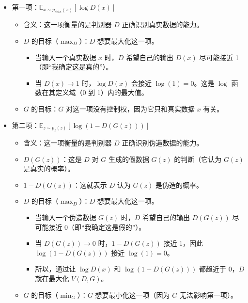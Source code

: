 \begin{itemize}
\tightlist
\item
  第一项：\(\mathbb{E}_{x\sim p_{data}(x)}[\log D(x)]\)

  \begin{itemize}
  \tightlist
  \item
    含义：这一项衡量的是判别器 \(D\) 正确识别真实数据的能力。
  \item
    \(D\) 的目标（\(\max_D\)）：\(D\) 想要最大化这一项。

    \begin{itemize}
    \tightlist
    \item
      当输入一个真实数据 \(x\) 时，\(D\) 希望自己的输出 \(D(x)\) 尽可能接近 1（即``我确定这是真的''）。
    \item
      当 \(D(x)\to 1\) 时，\(\log D(x)\) 会接近 \(\log(1)=0\)。这是 \(\log\) 函数在其定义域（0 到 1）内的最大值。
    \end{itemize}
  \item
    \(G\) 的目标：\(G\) 对这一项没有控制权，因为它只和真实数据 \(x\) 有关。
  \end{itemize}
\item
  第二项：\(\mathbb{E}_{z\sim p_z(z)}[\log(1-D(G(z)))]\)

  \begin{itemize}
  \tightlist
  \item
    含义：这一项衡量的是判别器 \(D\) 正确识别伪造数据的能力。
  \item
    \(D(G(z))\)：这是 \(D\) 对 \(G\) 生成的假数据 \(G(z)\) 的判断（它认为 \(G(z)\) 是真实的概率）。
  \item
    \(1-D(G(z))\)：这就表示 \(D\) 认为 \(G(z)\) 是伪造的概率。
  \item
    \(D\) 的目标（\(\max_D\)）：\(D\) 想要最大化这一项。

    \begin{itemize}
    \tightlist
    \item
      当输入一个伪造数据 \(G(z)\) 时，\(D\) 希望自己的输出 \(D(G(z))\) 尽可能接近 0（即``我确定这是假的''）。
    \item
      当 \(D(G(z))\to 0\) 时，\(1-D(G(z))\) 接近 1，因此 \(\log(1-D(G(z)))\) 接近 \(\log(1)=0\)。
    \item
      所以，通过让 \(\log D(x)\) 和 \(\log(1-D(G(z)))\) 都趋近于 0，\(D\) 就在最大化 \(V(D,G)\)。
    \end{itemize}
  \item
    \(G\) 的目标（\(\min_G\)）：\(G\) 想要最小化这一项（因为 \(G\) 无法影响第一项）。


\end{itemize}
\end{itemize}
